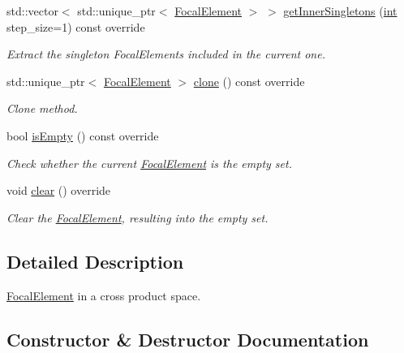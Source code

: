 \begin{DoxyCompactItemize}
std\+::vector$<$ std\+::unique\+\_\+ptr$<$ \hyperlink{classFocalElement}{Focal\+Element} $>$ $>$ \hyperlink{classCompositeFocalElement_aae945111cdffaaa5dc3216e439ac6ad2}{get\+Inner\+Singletons} (\hyperlink{CMakeCache_8txt_a79a3d8790b2588b09777910863574e09}{int} step\+\_\+size=1) const override
\begin{DoxyCompactList}\small\item\em Extract the singleton Focal\+Elements included in the current one. \end{DoxyCompactList}\item 
std\+::unique\+\_\+ptr$<$ \hyperlink{classFocalElement}{Focal\+Element} $>$ \hyperlink{classCompositeFocalElement_a3ae99f9c094419664e443d650560baf4}{clone} () const override
\begin{DoxyCompactList}\small\item\em Clone method. \end{DoxyCompactList}\item 
bool \hyperlink{classCompositeFocalElement_a015e5fa735f796d4ac38aec2e332b49a}{is\+Empty} () const override
\begin{DoxyCompactList}\small\item\em Check whether the current \hyperlink{classFocalElement}{Focal\+Element} is the empty set. \end{DoxyCompactList}\item 
void \hyperlink{classCompositeFocalElement_a010c40507f9c45da7327f0418ea32b53}{clear} () override
\begin{DoxyCompactList}\small\item\em Clear the \hyperlink{classFocalElement}{Focal\+Element}, resulting into the empty set. \end{DoxyCompactList}\end{DoxyCompactItemize}


\subsection{Detailed Description}
\hyperlink{classFocalElement}{Focal\+Element} in a cross product space. 

\subsection{Constructor \& Destructor Documentation}
